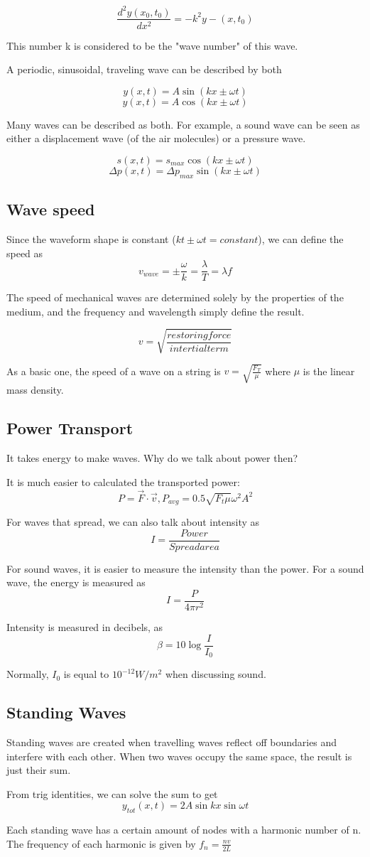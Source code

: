 \documentclass{article}
\begin{document}
$$\frac{d^2y(x_0,t_0)}{dx^2}=-k^2y-(x,t_0)$$

This number k is considered to be the "wave number" of this wave.

A periodic, sinusoidal, traveling wave can be described by both

$$y(x,t)=A\sin{(kx\pm \omega t)}$$
$$y(x,t)=A\cos{(kx\pm \omega t)}$$

Many waves can be described as both. For example, a sound wave can be seen as either a displacement wave (of the air molecules)
or a pressure wave. 

$$s(x,t)=s_{max}\cos{(kx\pm \omega t)}$$
$$\Delta p(x,t)=\Delta p_{max}\sin{(kx\pm \omega t)}$$

\subsection{Wave speed}

Since the waveform shape is constant ($kt\pm \omega t = constant$), we can define the speed as 
$$v_{wave}=\pm \frac{\omega}{k}=\frac{\lambda}{T}=\lambda f$$

The speed of mechanical waves are determined solely by the properties of the medium, and the frequency and wavelength simply
define the result.

$$v=\sqrt{\frac{restoring force}{intertial term}}$$

As a basic one, the speed of a wave on a string is $v=\sqrt{\frac{F_T}{\mu}}$ where $\mu$ is the linear mass density.

\subsection{Power Transport}
It takes energy to make waves. Why do we talk about power then?

It is much easier to calculated the transported power: $$P=\vec{F}\cdot\vec{v}, P_{avg}=0.5\sqrt{F_t\mu}\omega^2A^2$$

For waves that spread, we can also talk about intensity as 
$$I=\frac{Power}{Spread area}$$

For sound waves, it is easier to measure the intensity than the power. For a sound wave, the energy is measured as $$I=\frac{P}{4\pi r^2}$$

Intensity is measured in decibels, as $$\beta=10\log{\frac{I}{I_0}}$$

Normally, $I_0$ is equal to $10^{-12} W/m^2$ when discussing sound.

\subsection{Standing Waves}

Standing waves are created when travelling waves reflect off boundaries and interfere with each other. When two waves occupy the same space, the result is 
just their sum.

From trig identities, we can solve the sum to get $$y_{tot}(x,t)=2A\sin{kx}\sin{\omega t}$$

Each standing wave has a certain amount of nodes with a harmonic number of n. The frequency of each harmonic is given by $f_n=\frac{nv}{2L}$
\end{document}
